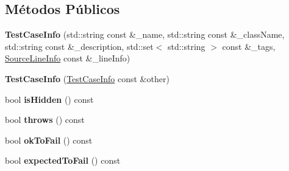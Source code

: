 \subsection*{Métodos Públicos}
\begin{DoxyCompactItemize}
\item 
{\bfseries Test\+Case\+Info} (std\+::string const \&\+\_\+name, std\+::string const \&\+\_\+class\+Name, std\+::string const \&\+\_\+description, std\+::set$<$ std\+::string $>$ const \&\+\_\+tags, \hyperlink{structCatch_1_1SourceLineInfo}{Source\+Line\+Info} const \&\+\_\+line\+Info)\hypertarget{structCatch_1_1TestCaseInfo_a35ec65315e0d1f178491b5a59f3f3123}{}\label{structCatch_1_1TestCaseInfo_a35ec65315e0d1f178491b5a59f3f3123}

\item 
{\bfseries Test\+Case\+Info} (\hyperlink{structCatch_1_1TestCaseInfo}{Test\+Case\+Info} const \&other)\hypertarget{structCatch_1_1TestCaseInfo_ac338adb4e38f4bf3977fb45b2b1fe447}{}\label{structCatch_1_1TestCaseInfo_ac338adb4e38f4bf3977fb45b2b1fe447}

\item 
bool {\bfseries is\+Hidden} () const \hypertarget{structCatch_1_1TestCaseInfo_a01ac8b11d8c105e5278a239ab5214257}{}\label{structCatch_1_1TestCaseInfo_a01ac8b11d8c105e5278a239ab5214257}

\item 
bool {\bfseries throws} () const \hypertarget{structCatch_1_1TestCaseInfo_a19fb4f0b755956eee8a1fecf713fb7ca}{}\label{structCatch_1_1TestCaseInfo_a19fb4f0b755956eee8a1fecf713fb7ca}

\item 
bool {\bfseries ok\+To\+Fail} () const \hypertarget{structCatch_1_1TestCaseInfo_a64586336bb49bd6e9ef8a089b072a712}{}\label{structCatch_1_1TestCaseInfo_a64586336bb49bd6e9ef8a089b072a712}

\item 
bool {\bfseries expected\+To\+Fail} () const \hypertarget{structCatch_1_1TestCaseInfo_a1ed1c3689c2874c421466945bd3cb75c}{}\label{structCatch_1_1TestCaseInfo_a1ed1c3689c2874c421466945bd3cb75c}

\end{DoxyCompactItemize}
